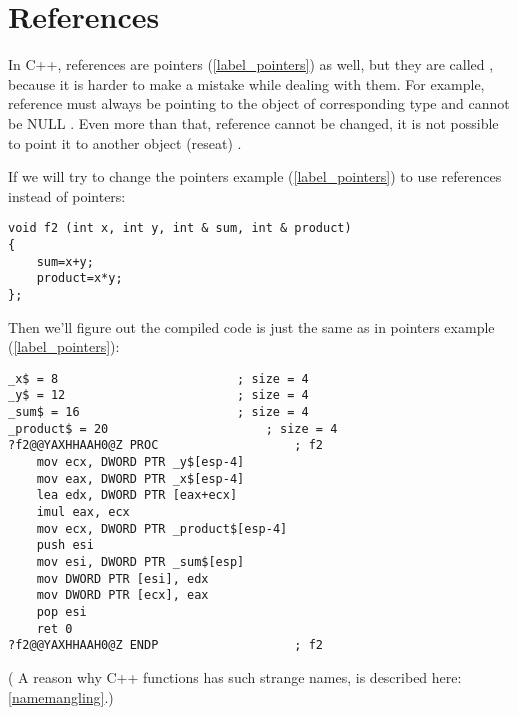 ﻿\section{References}
\label{cpp_references}

{In C++, references are pointers (\ref{label_pointers}) as well, but they are called , because it is harder to make a mistake while
dealing with them}\cite[8.3.2]{CPP11}.
{For example, reference must always be pointing to the object of corresponding type and cannot be NULL}
\cite[8.6]{ParashiftCPPFAQ}.
{Even more than that, reference cannot be changed, it is not possible to point it to another object (reseat)}
\cite[8.5]{ParashiftCPPFAQ}.

{If we will try to change the pointers example (\ref{label_pointers}) to use references instead of pointers:}

\begin{lstlisting}
void f2 (int x, int y, int & sum, int & product)
{
	sum=x+y;
	product=x*y;
};
\end{lstlisting}

{Then we'll figure out the compiled code is just the same 
as in pointers example (\ref{label_pointers}):}

\begin{lstlisting}[caption=\Optimizing MSVC 2010]
_x$ = 8							; size = 4
_y$ = 12						; size = 4
_sum$ = 16						; size = 4
_product$ = 20						; size = 4
?f2@@YAXHHAAH0@Z PROC					; f2
	mov	ecx, DWORD PTR _y$[esp-4]
	mov	eax, DWORD PTR _x$[esp-4]
	lea	edx, DWORD PTR [eax+ecx]
	imul eax, ecx
	mov ecx, DWORD PTR _product$[esp-4]
	push esi
	mov	esi, DWORD PTR _sum$[esp]
	mov	DWORD PTR [esi], edx
	mov	DWORD PTR [ecx], eax
	pop	esi
	ret	0
?f2@@YAXHHAAH0@Z ENDP					; f2
\end{lstlisting}

(
{A reason why C++ functions has such strange names, is described here}: \ref{namemangling}.)
